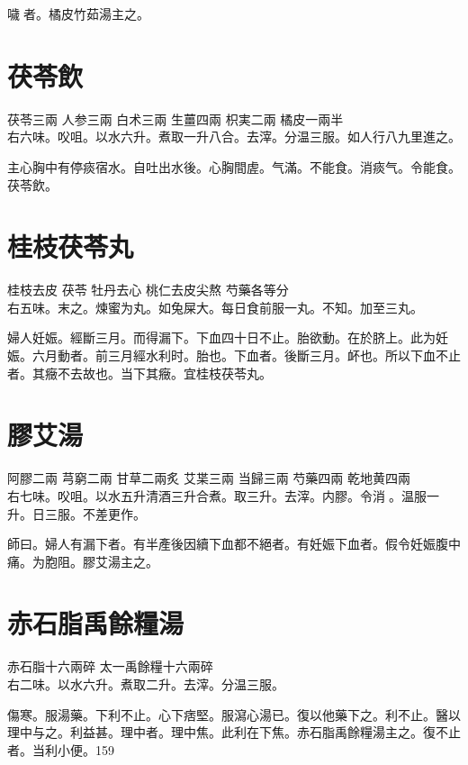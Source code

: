 噦{\sungii 𠱘}者。橘皮竹茹湯主之。

\section{茯苓飲}

茯苓{\scriptsize 三兩} 人参{\scriptsize 三兩} 白术{\scriptsize 三兩} 生薑{\scriptsize 四兩} 枳実{\scriptsize 二兩} 橘皮{\scriptsize 一兩半}\\
右六味。㕮咀。以水六升。煮取一升八合。去滓。分温三服。如人行八九里進之。

主心胸中有停痰宿水。自吐出水後。心胸間虗。气滿。不能食。消痰气。令能食。茯苓飲。

\section{桂枝茯苓丸}

桂枝{\scriptsize 去皮} 茯苓{ }牡丹{\scriptsize 去心} 桃仁{\scriptsize 去皮尖熬} 芍藥{\scriptsize 各等分}\\
右五味。末之。煉蜜为丸。如兔屎大。每日{\khaai 食前服}一丸。不知。加至三丸。

婦人妊娠。經斷三月。而得漏下。下血四十日不止。胎欲動。在於脐上。此为妊娠。六月動者。前三月經水利时。胎也。下血者。後斷三月。衃也。所以下血不止者。其癥不去故也。当下其癥。宜桂枝茯苓丸。

\section{膠艾湯}

阿膠{\scriptsize 二兩} 芎窮{\scriptsize 二兩} 甘草{\scriptsize 二兩炙} 艾枼{\scriptsize 三兩} 当歸{\scriptsize 三兩} 芍藥{\scriptsize 四兩} 乾地黄{\scriptsize 四兩}\\
右七味。㕮咀。以水五升清酒三升合煮。取三升。去滓。内膠。令消{\sungii 𥁞}。温服一升。日三服。不差更作。

師曰。婦人有漏下者。有半產後因續下血都不絕者。有妊娠下血者。假令妊娠腹中痛。为胞阻。膠艾湯主之。

\section{赤石脂禹餘糧湯}

赤石脂{\scriptsize 十六兩碎} 太一禹餘糧{\scriptsize 十六兩碎}\\
右二味。以水六升。煮取二升。去滓。分温三服。

傷寒。服湯藥。下利不止。心下痞堅。服瀉心湯已。復以他藥下之。利不止。醫以理中与之。利益甚。理中者。理中焦。此利在下焦。赤石脂禹餘糧湯主之。復不止者。当利小便。159

